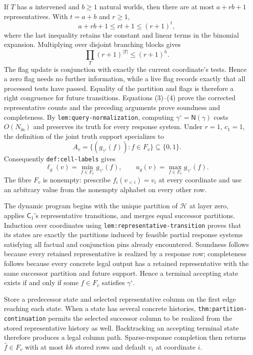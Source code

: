 If \(T\) has \(a\) intervened and \(b\geq1\) natural worlds, then there are at most \(a+rb+1\) representatives. With \(t=a+b\) and \(r\geq1\),
\[
 a+rb+1\leq rt+1\leq(r+1)^t,
\]
where the last inequality retains the constant and linear terms in the binomial expansion. Multiplying over disjoint branching blocks gives
\[
 \prod_T(r+1)^{|T|}\leq(r+1)^h.
 \tag{4}
\]
The flag update is conjunction with exactly the current coordinate's tests. Hence a zero flag needs no further information, while a live flag records exactly that all processed tests have passed. Equality of the partition and flags is therefore a right congruence for future transitions. Equations (3)--(4) prove the corrected representative counts and the preceding arguments prove soundness and completeness.
By \texttt{lem:query-normalization}, computing \(\gamma^{\circ}=\mathsf N(\gamma)\) costs \(O(N_{\mathrm{in}})\) and preserves its truth for every response system. Under \(r=1\), \(c_1=1\), the definition of the joint truth support specializes to
\[
 A_v=\{(g_{\gamma^{\circ}}(f)):f\in F_v\}\subseteq\{0,1\}.
\]
Consequently \texttt{def:cell-labels} gives
\[
 \ell_g(v)=\min_{f\in F_v}g_{\gamma^{\circ}}(f),
 \qquad
 u_g(v)=\max_{f\in F_v}g_{\gamma^{\circ}}(f).
 \tag{5}
\]
The fibre \(F_v\) is nonempty: prescribe \(f_i(v_{<i})=v_i\) at every coordinate and use an arbitrary value from the nonempty alphabet on every other row.

The dynamic program begins with the unique partition of \(\mathcal H\) at layer zero, applies \(\mathsf C_1\)'s representative transitions, and merges equal successor partitions. Induction over coordinates using \texttt{lem:representative-transition} proves that its states are exactly the partitions induced by feasible partial response systems satisfying all factual and conjunction pins already encountered. Soundness follows because every retained representative is realized by a response row; completeness follows because every concrete legal output has a retained representative with the same successor partition and future support. Hence a terminal accepting state exists if and only if some \(f\in F_v\) satisfies \(\gamma^{\circ}\).

Store a predecessor state and selected representative column on the first edge reaching each state. When a state has several concrete histories, \texttt{thm:partition-continuation} permits the selected successor column to be realized from the stored representative history as well. Backtracking an accepting terminal state therefore produces a legal column path. Sparse-response completion then returns \(\widehat f\in F_v\) with at most \(kh\) stored rows and default \(v_i\) at coordinate \(i\).

